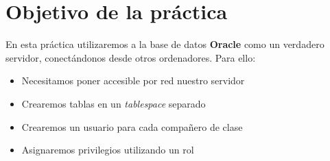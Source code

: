 
\usepackage{eurosym}





\renewcommand{\hmwkTitle}{Usuarios y permisos}
\renewcommand{\hmwkClass}{ASGBD}

\usepackage{blindtext}






\primerapagina

\section{Objetivo de la práctica}
En esta práctica utilizaremos a la base de datos \textbf{Oracle} como un verdadero servidor, conectándonos desde otros ordenadores. Para ello:
\begin{itemize}
\item Necesitamos poner accesible por red nuestro servidor
\item Crearemos tablas en un \textit{tablespace} separado
\item Crearemos un usuario para cada compañero de clase
\item Asignaremos privilegios utilizando un rol
\end{itemize}

